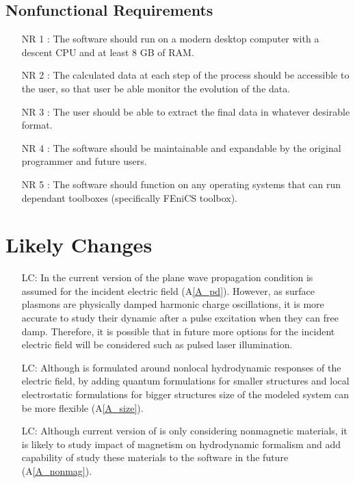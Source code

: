 \documentclass[12pt]{article}
\newcounter{lcnum} %
\begin{document}
	\subsection{Nonfunctional Requirements}
	
	\begin{itemize} \item[NR 1 \label{NR_RAM}:] The software should run on a modern
		desktop computer with a descent CPU and at least 8 GB of RAM.
		
		\item[NR 2 \label{NR_data}:] The calculated data at each step of the process
		should be accessible to the user, so that user be able monitor the evolution
		of the data.
		
		\item[NR 3 \label{NR_Output}:] The user should be able to extract the final
		data in whatever desirable format.
		
		\item[NR 4 \label{R_update}:] The software should be maintainable and
		expandable by the original programmer and future users.
		
		\item[NR 5 \label{R_compatibility}:] The software should function on any
		operating systems that can run dependant toolboxes (specifically FEniCS
		toolbox). \end{itemize}
	
	
	\section{Likely Changes}
	
	\noindent \begin{itemize}
		
		\item[LC\refstepcounter{lcnum}\thelcnum\label{LC_lightsource}:] In the current
		version of the \progname{} plane wave propagation condition is assumed for the
		incident electric field (A\ref{A_pd}). However, as surface plasmons are
		physically damped harmonic charge oscillations, it is more accurate to study
		their dynamic after a pulse excitation when they can free damp. Therefore, it is
		possible that in future more options for the incident electric field will be
		considered such as pulsed laser illumination.
		
		\item[LC\refstepcounter{lcnum}\thelcnum\label{LC_size}:] Although \progname{} is
		formulated around nonlocal hydrodynamic responses of the electric field, by
		adding quantum formulations for smaller structures and local electrostatic
		formulations for bigger structures size of the modeled system can be more
		flexible (A\ref{A_size}).
		
		
		\item[LC\refstepcounter{lcnum}\thelcnum\label{LC_magnetism}:] Although current
		version of \progname{} is only considering nonmagnetic materials, it is likely
		to study impact of magnetism on hydrodynamic formalism and add capability of
		study these materials to the software in the future (A\ref{A_nonmag}).
		
	\end{itemize}
	
\end{document}
